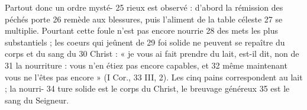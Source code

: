 Partout donc un ordre mysté-	 
25	 	rieux est observé : d'abord la rémission des péchés porte	 
26	 	remède aux blessures, puis l'aliment de la table céleste	 
27	 	se multiplie. Pourtant cette foule n'est pas encore nourrie	 
28	 	des mets les plus substantiels ; les coeurs qui jeûnent de	 
29	 	foi solide ne peuvent se repaître du corps et du sang du	 
30	 	Christ : « je vous ai fait prendre du lait, est-il dit, non de	 
31	 	la nourriture : vous n'en étiez pas encore capables, et	 
32	 	même maintenant vous ne l'êtes pas encore » (I Cor.,	 
33	 	III, 2). Les cinq pains correspondent au lait ; la nourri-	 
34	 	ture solide est le corps du Christ, le breuvage généreux	 
35	 	est le sang du Seigneur.